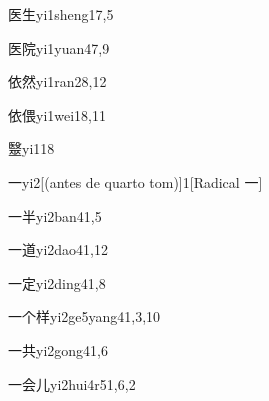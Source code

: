 \begin{entry}{医生}{yi1sheng1}{7,5}
\end{entry}

\begin{entry}{医院}{yi1yuan4}{7,9}
\end{entry}

\begin{entry}{依然}{yi1ran2}{8,12}
\end{entry}

\begin{entry}{依偎}{yi1wei1}{8,11}
\end{entry}

\begin{entry}{毉}{yi1}{18}
\end{entry}

\begin{entry}{一}{yi2}[(antes de quarto tom)]{1}[Radical 一]
\end{entry}

\begin{entry}{一半}{yi2ban4}{1,5}
\end{entry}

\begin{entry}{一道}{yi2dao4}{1,12}
\end{entry}

\begin{entry}{一定}{yi2ding4}{1,8}
\end{entry}

\begin{entry}{一个样}{yi2ge5yang4}{1,3,10}
\end{entry}

\begin{entry}{一共}{yi2gong4}{1,6}
\end{entry}

\begin{entry}{一会儿}{yi2hui4r5}{1,6,2}
\end{entry}

